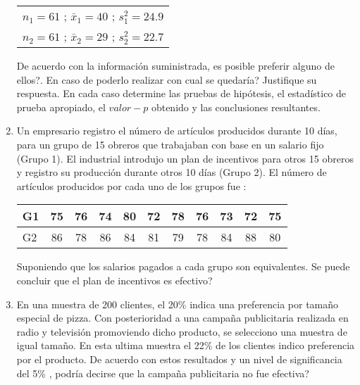 \documentclass[base=hide,9pt]{elegantbook}
\begin{document}
\begin{enumerate}
	\begin{tabular}{l}
		$n_{1}=61$ ;\hspace{1cm} $\bar{x}_{1}=40$ ;\hspace{1cm} $s^{2}_{1}=24.9$ \\
		$n_{2}=61$ ; \hspace{1cm}$\bar{x}_{2}=29$ ;\hspace{1cm} $s^{2}_{2}=22.7$ \\
	\end{tabular}
	\vspace{.5cm}
	
	De acuerdo con la información suministrada, es posible preferir alguno de ellos?. En caso de poderlo realizar con cual se quedaría? Justifique su respuesta. En cada caso determine las pruebas de hipótesis, el estadístico de prueba apropiado, el $valor-p$ obtenido y las conclusiones resultantes.
	
	\vspace{.5cm}
	\item  Un empresario registro el número de artículos producidos durante 10 días, para un grupo de 15 obreros que trabajaban con base en un salario fijo (Grupo 1). El industrial introdujo un plan de incentivos para otros 15 obreros y registro su producción durante otros 10 días (Grupo 2). El número de artículos producidos por cada uno de los grupos fue :   \\
	
	
	\begin{tabular}{l|cccccccccc}
		G1& 75&  76&  74&  80&  72&  78&  76&  73&  72&  75\\  \hline       
		G2& 86&  78&  86&  84&  81&  79&  78&  84&  88&  80\\  
	\end{tabular}
	
	\vspace{.2cm}
	Suponiendo que los salarios pagados a cada grupo son equivalentes. Se puede concluir que el plan de incentivos es efectivo?
	\vspace{.5cm}
	\item En una muestra de 200 clientes, el 20\% indica una preferencia por tamaño especial de pizza.  Con posterioridad a una campaña publicitaria realizada en radio y televisión promoviendo dicho producto, se selecciono una muestra de igual tamaño.  En esta ultima muestra el 22\% de los clientes indico preferencia por el producto. De acuerdo con estos resultados y un nivel de significancia del 5\% , podría decirse que la campaña publicitaria no fue efectiva? 
	\vspace{.5cm}
	

\end{enumerate}
\end{document}
